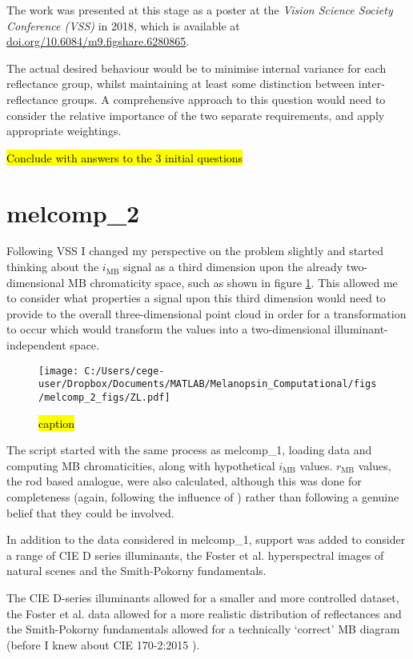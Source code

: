 \documentclass{article}
\begin{document}
The work was presented at this stage as a poster at the \emph{Vision Science Society Conference (VSS)} in 2018, which is available at \url{doi.org/10.6084/m9.figshare.6280865}.

The actual desired behaviour would be to minimise internal variance for each reflectance group, whilst maintaining at least some distinction between inter-reflectance groups. A comprehensive approach to this question would need to consider the relative importance of the two separate requirements, and apply appropriate weightings.

\hl{Conclude with answers to the 3 initial questions}

\section{melcomp\_2}

Following VSS I changed my perspective on the problem slightly and started thinking about the $i_{\text{MB}}$ signal as a third dimension upon the already two-dimensional \ac{MB} chromaticity space, such as shown in figure \ref{fig:ZL}. This allowed me to consider what properties a signal upon this third dimension would need to provide to the overall three-dimensional point cloud in order for a transformation to occur which would transform the values into a two-dimensional illuminant-independent space.

\begin{figure}[h]
    \centering
    \texttt{[image: C:/Users/cege-user/Dropbox/Documents/MATLAB/Melanopsin\_Computational/figs/melcomp\_2\_figs/ZL.pdf]}
    \caption{\hl{caption}}
    \label{fig:ZL}
\end{figure} 

The script started with the same process as melcomp\_1, loading data and computing \ac{MB} chromaticities, along with hypothetical $i_{\text{MB}}$ values. $r_{\text{MB}}$ values, the rod based analogue, were also calculated, although this was done for completeness (again, following the influence of \cite{barrionuevo_contributions_2014}) rather than following a genuine belief that they could be involved.

In addition to the data considered in melcomp\_1, support was added to consider a range of CIE D series illuminants, the Foster et al. hyperspectral images of natural scenes and the Smith-Pokorny fundamentals.

The CIE D-series illuminants allowed for a smaller and more controlled dataset, the Foster et al. data allowed for a more realistic distribution of reflectances and the Smith-Pokorny fundamentals allowed for a technically `correct' \ac{MB} diagram (before I knew about CIE 170-2:2015 \cite{cie_cie_2015}).
\end{document}
